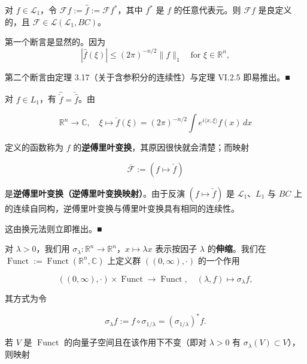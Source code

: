 \begin{remark}

\begin{items}
\item

对 $ f \in \mathcal{L}_1 $，令 $ \mathcal{F}f := \hat{f} := \mathcal{F}f^{*} $，其中 $ f^{*} $ 是 $ f $ 的任意代表元。则 $ \mathcal{F}f $ 是良定义的，且 $ \mathcal{F} \in \mathcal{L}(\mathcal{L}_1, BC) $。

\proofhead
第一个断言是显然的。因为
\[
|\hat{f}(\xi)| \le (2\pi)^{-n/2}\|f\|_1 \quad \text{for } \xi \in \mathbb{R}^n ,
\]

第二个断言由定理 3.17（关于含参积分的连续性）与定理 VI.2.5 即易推出。\nobreak\hspace{0.35em}■

\item

对 $ f \in L_1 $，有 $ \widehat{\check{f}} = \check{\hat{f}} $。由

\[
\mathbb{R}^n \to \mathbb{C} , \quad \xi \mapsto \check{f}(\xi) = (2\pi)^{-n/2}\int e^{i\langle x,\xi\rangle} f(x)\,dx
\]

定义的函数称为 $ f $ 的\textbf{逆傅里叶变换}，其原因很快就会清楚；而映射

\[
\overline{\mathcal{F}} := (f \mapsto \check{f})
\]

是\textbf{逆傅里叶变换（逆傅里叶变换映射）}。由于反演 $ (f \mapsto \check{f}) $ 是 $ \mathcal{L}_1 $、$ L_1 $ 与 $ BC $ 上的连续自同构，逆傅里叶变换与傅里叶变换具有相同的连续性。

\proofhead
这由换元法则立即推出。\nobreak\hspace{0.35em}■
\item

对 $ \lambda > 0 $，我们用 $ \sigma_\lambda: \mathbb{R}^n \to \mathbb{R}^n $，$ x \mapsto \lambda x $ 表示按因子 $ \lambda $ 的\textbf{伸缩}。我们在 $ \operatorname{Funct} := \operatorname{Funct}(\mathbb{R}^n,\mathbb{C}) $ 上定义群 $ ((0,\infty),\cdot) $ 的一个作用

\begin{equation}
((0,\infty),\cdot) \times \operatorname{Funct} \to \operatorname{Funct} , \quad (\lambda,f) \mapsto \sigma_\lambda f ,\tag{9.2}
\end{equation}

其方式为令

\[
\sigma_\lambda f := f \circ \sigma_{1/\lambda} = (\sigma_{1/\lambda})^{*}f .
\]

若 $ V $ 是 $ \operatorname{Funct} $ 的向量子空间且在该作用下不变（即对 $ \lambda > 0 $ 有 $ \sigma_\lambda(V) \subset V $），则映射


\end{items}
\end{remark}

